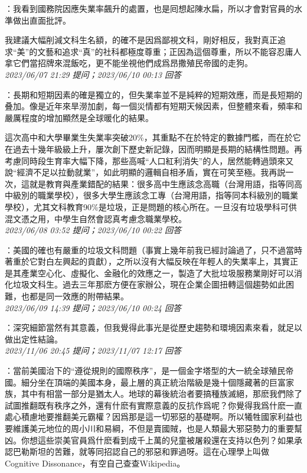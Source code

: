 \documentclass[twocolumn]{ctexart}
\begin{document}
：我看到國務院因應失業率飆升的處置，也是囘想起陳水扁，所以才會對官員的水準做出直面批評。

我建議大幅削減文科生名額，的確不是因爲鄙視文科，剛好相反，我對真正追求“美”的文藝和追求“真”的社科都極度尊重；正因為這個尊重，所以不能容忍庸人拿它們當招牌來混飯吃，更不能坐視他們成爲昂撒殖民帝國的走狗。
\\

\textit{\hfill\noindent\small 2023/06/07 21:29 提问；2023/06/10 00:13 回答}

：長期和短期因素的確是獨立的，但失業率並不是純粹的短期效應，而是長短期的叠加。像是近年來旱澇加劇，每一個災情都有短期天候因素，但整體來看，頻率和嚴厲程度的增加顯然是全球暖化的結果。

這次高中和大學畢業生失業率突破20\%，其重點不在於特定的數據門檻，而在於它在過去十幾年級級上升，屢次創下歷史新記錄，因而明顯是長期的結構性問題。再考慮同時段生育率大幅下降，那些高喊“人口紅利消失”的人，居然能轉過頭來又說“經濟不足以拉動就業”，如此明顯的邏輯自相矛盾，實在可笑至極。我再説一次，這就是教育與產業錯配的結果：很多高中生應該念高職（台灣用語，指等同高中級別的職業學校），很多大學生應該念工專（台灣用語，指等同本科級別的職業學校），尤其文科教育90\%是垃圾，正是問題的核心所在。一旦沒有垃圾學科可供混文憑之用，中學生自然會認真考慮念職業學校。
\\

\textit{\hfill\noindent\small 2023/06/08 03:52 提问；2023/06/10 00:22 回答}

：美國的確也有嚴重的垃圾文科問題（事實上幾年前我已經討論過了，只不過當時著重於它對白左興起的貢獻），之所以沒有大幅反映在年輕人的失業率上，其實正是其產業空心化、虛擬化、金融化的效應之一，製造了大批垃圾服務業剛好可以消化垃圾文科生。過去三年那麽方便在家辦公，現在企業企圖扭轉這個趨勢如此困難，也都是同一效應的附帶結果。
\\

\textit{\hfill\noindent\small 2023/06/09 14:39 提问；2023/06/10 00:24 回答}

：深究細節當然有其意義，但我覺得此事光是從歷史趨勢和環境因素來看，就足以做出定性結論。
\\

\textit{\hfill\noindent\small 2023/11/06 20:45 提问；2023/11/07 12:17 回答}

：當前美國治下的“遵從規則的國際秩序”，是一個金字塔型的大一統全球殖民帝國。細分坐在頂端的美國本身，最上層的真正統治階級是幾十個隱藏著的巨富家族，其中有相當一部分是猶太人。地球的幕後統治者要搞種族滅絕，那麽我們除了試圖推翻既有秩序之外，還有什麽有實際意義的反抗作爲呢？你覺得我爲什麽一直處心積慮地要推翻美元霸權？因爲那是這一切邪惡的基礎啊。所以犧牲國家利益也要維護美元地位的周小川和易綱，不但是賣國賊，也是人類最大邪惡勢力的重要幫凶。你想這些崇美官員爲什麽看到成千上萬的兒童被屠殺還在支持以色列？如果承認巴勒斯坦的苦難，就等同招認自己的邪惡和罪過呀。這在心理學上叫做Cognitive Dissonance，有空自己查查Wikipedia。
\end{document}
